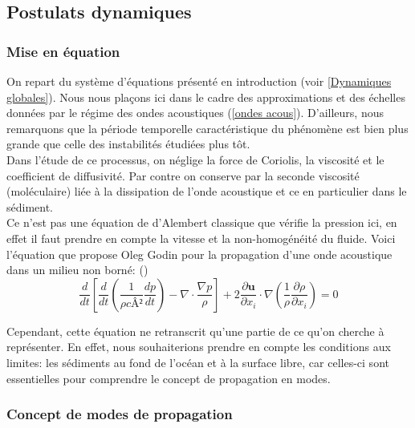 \documentclass{rapportECC}
\begin{document}
\subsection{Postulats dynamiques}
\subsubsection{Mise en équation}


On repart du système d'équations présenté en introduction (voir \§ \ref{Dynamiques globales}). Nous nous plaçons ici dans le cadre des approximations et des échelles données par le régime des ondes acoustiques (\ref{ondes acous}). D'ailleurs, nous remarquons que la période temporelle caractéristique du phénomène est bien plus grande que celle des instabilités étudiées plus tôt.
\\
Dans l'étude de ce processus, on néglige la force de Coriolis, la viscosité et le coefficient de diffusivité. Par contre on conserve par la seconde viscosité (moléculaire) liée à la dissipation de l'onde acoustique et ce en particulier dans le sédiment.
\\
Ce n'est pas une équation de d'Alembert classique que vérifie la pression ici, en effet il faut prendre en compte la vitesse et la non-homogénéité du fluide. Voici l'équation que propose Oleg Godin pour la propagation d'une onde acoustique dans un milieu non borné: (\cite{godin_wave_2011}) 
\begin{equation}
    \frac{d}{dt}[\frac{d}{dt}(\frac{1}{\rho cÂ²}\frac{dp}{dt}) - \nabla \cdot \frac{\nabla p}{\rho}] + 2\frac{\partial \mathbf{u}}{\partial x_i} \cdot \nabla (\frac{1}{\rho}\frac{\partial \rho}{\partial x_i}) = 0
\end{equation}

Cependant, cette équation ne retranscrit qu'une partie de ce qu'on cherche à représenter. En effet, nous souhaiterions prendre en compte les conditions aux limites: les sédiments au fond de l'océan et à la surface libre, car celles-ci sont essentielles pour comprendre le concept de propagation en modes. 

\subsubsection{Concept de modes de propagation}
\end{document}
